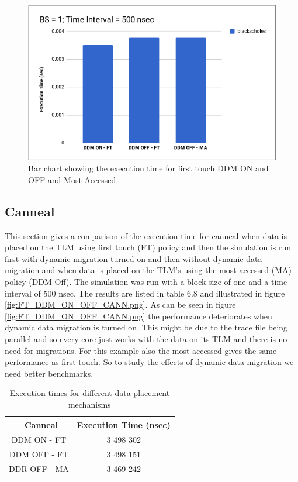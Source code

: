 \documentclass{listhesis}
\begin{document}
\begin{figure}
  \includegraphics[width=\linewidth]{FT_DDM_ON_OFF_BLACK.png}
  \centering
  \caption{Bar chart showing the execution time for first touch DDM ON and OFF and Most Accessed}
  \label{fig:FT_DDM_ON_OFF_BLACK.png}
\end{figure}

\subsection{Canneal}
This section gives a comparison of the execution time for canneal when data is placed on the TLM using first touch (FT) policy and then the simulation is run first with dynamic migration turned on and then without dynamic data migration and when data is placed on the TLM's using the most accessed (MA) policy (DDM Off). The simulation was run with a block size of one and a time interval of 500 nsec. The results are listed in table 6.8 and illustrated in figure \ref{fig:FT_DDM_ON_OFF_CANN.png}. As can be seen in figure \ref{fig:FT_DDM_ON_OFF_CANN.png} the performance deteriorates when dynamic data migration is turned on. This might be due to the trace file being parallel and so every core just works with the data on its TLM and there is no need for migrations. For this example also the most accessed gives the same performance as first touch. So to study the effects of dynamic data migration we need better benchmarks. \\

\begin{table}[h!]
\begin{center}
 \begin{tabular}{|| c | c ||} 
 \hline
 \ \textbf{Canneal}  & \textbf{Execution Time (nsec)}\\ [0.5 ex] 
 \hline\hline
   DDM ON - FT & 3 498 302 \\ 
 \hline
   DDM OFF - FT & 3 498 151 \\
 \hline
   DDR OFF - MA & 3 469 242 \\
 \hline
\end{tabular}
 \caption{Execution times for different data placement mechanisms}
 \label{table:ExecTimes5}
\end{center}
\end{table}
\end{document}
